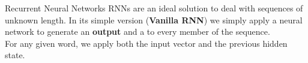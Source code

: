 \documentclass[9pt]{beamer}
\begin{document}
\begin{frame}{Recurrent Neural Networks}
    RNNs are an ideal solution to deal with sequences of unknown length. In its simple version (\textbf{Vanilla RNN}) we simply apply a neural network to generate an \textbf{output} and a  to every member of the sequence.
    \vspace{4.5cm}\\ For any given word, we apply both the input vector and the previous hidden state.
\end{frame}
\end{document}
